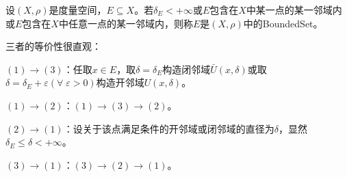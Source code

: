 \begin{definition}
	设$(X,\rho)$是度量空间，$E\subseteq X$。若$\delta_E<+\infty$或$E$包含在$X$中某一点的某一邻域内或$E$包含在$X$中任意一点的某一邻域内，则称$E$是$(X,\rho)$中的\gls{BoundedSet}。
\end{definition}
\begin{note}
	三者的等价性很直观：\par
	$(1)\to(3)$：任取$x\in E$，取$\delta=\delta_E$构造闭邻域$\bar{U}(x,\delta)$或取$\delta=\delta_E+\varepsilon(\forall\;\varepsilon>0)$构造开邻域$U(x,\delta)$。\par
	$(1)\to(2)$：$(1)\to(3)\to(2)$。\par
	$(2)\to(1)$：设关于该点满足条件的开邻域或闭邻域的直径为$\delta$，显然$\delta_E\leqslant\delta<+\infty$。\par 
	$(3)\to(1)$：$(3)\to(2)\to(1)$。
\end{note}

